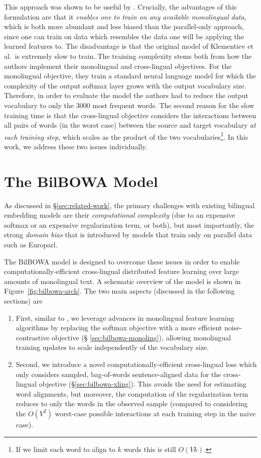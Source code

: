 \documentclass[10pt]{article}
\begin{document}
This approach was shown to be useful by \cite{klementiev2012}.  
Crucially, the advantages of this formulation are that it
\emph{enables one to train on any available monolingual data}, which is both more
abundant and less biased than the parallel-only approach, since one can train
on data which resembles the data one will be applying the learned features to.
The disadvantage is that the original model of Klementiev et al.\ is extremely
slow to train. The training complexity stems both from how the authors implement their
monolingual and cross-lingual objectives. For the monolingual objective, they
train a standard neural language model for which the complexity of the output 
softmax layer grows with the output vocabulary size. Therefore, in order to evaluate the model
the authors had to reduce the output vocabulary to only the $3000$ most frequent
words. The second reason for the slow training time is that the
cross-lingual objective considers the interactions between all pairs of words
(in the worst case) between the source and target vocabulary \emph{at each training step}, 
which scales as the product of the two vocabularies\footnote{If we 
limit each word to align to $k$ words this is still $O(Vk)$.}. In this work, we address these two issues
individually.

\section{The BilBOWA Model}
\label{sec:bilbowa}

As discussed in \S \ref{sec:related-work}, the primary challenges with existing
bilingual embedding models are their \emph{computational complexity} (due to an
expensive softmax or an expensive regularization term, or both), but most
importantly, the strong \emph{domain bias} that is introduced by models that
train only on parallel data such as Europarl. 

The BilBOWA model is designed to overcome these issues in order to enable 
computationally-efficient cross-lingual distributed feature learning over large 
amounts of monolingual text. A schematic overview of the
model is shown in Figure~\ref{fig:bilbowa-arch}. The two main aspects (discussed in the
following sections) are
\begin{enumerate}
  \item First, similar to \cite{zoubilingual}, we leverage advances in
    monolingual feature learning algorithms by replacing the softmax objective
    with a more efficient noise-contrastive objective (\S
    \ref{sec:bilbowa-monoling}), allowing monolingual training updates to scale
    independently of the vocabulary size.
  \item Second, we introduce a novel computationally-efficient cross-lingual loss 
    which only considers sampled, bag-of-words sentence-aligned data
    for the cross-lingual objective (\S \ref{sec:bilbowa-xling}). This avoids
    the need for estimating word alignments, but moreover, the computation of
    the regularization term reduces to only the words in the observed sample
    (compared to considering the $O(V^2)$ worst-case possible interactions at
    each training step in the naive case). 
\end{enumerate}
\end{document}

